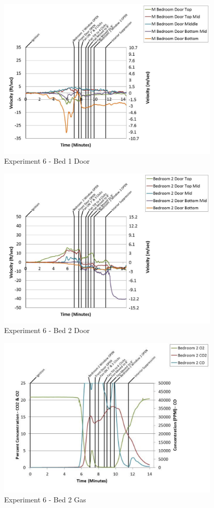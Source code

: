 \documentclass{article}
\begin{document}
\begin{appendices}
	\clearpage

	\begin{figure}[h!]
		\centering
		\includegraphics[height=3.05in]{0_Images/Results_Charts/Exp_6_Charts/Bed1Door.pdf}
		\caption{Experiment 6 - Bed 1 Door}
	\end{figure}
 

	\begin{figure}[h!]
		\centering
		\includegraphics[height=3.05in]{0_Images/Results_Charts/Exp_6_Charts/Bed2Door.pdf}
		\caption{Experiment 6 - Bed 2 Door}
	\end{figure}
 
	\clearpage

	\begin{figure}[h!]
		\centering
		\includegraphics[height=3.05in]{0_Images/Results_Charts/Exp_6_Charts/Bed2Gas.pdf}
		\caption{Experiment 6 - Bed 2 Gas}
	\end{figure}
 


\end{appendices}
\end{document}

